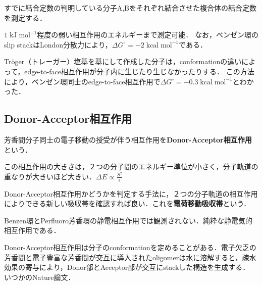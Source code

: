 \documentclass[uplatex, dvipdfmx]{jsreport}
\begin{document}
\begin{method}
    すでに結合定数の判明している分子A,Bをそれぞれ結合させた複合体の結合定数を測定する．

    $1\;\mathrm{kJ\;mol^{-1}}$程度の弱い相互作用のエネルギーまで測定可能．
    なお，ベンゼン環のslip stackはLondon分散力により，$\Delta G^\circ=-2\;\mathrm{kcal\;mol^{-1}}$である．
\end{method}
\begin{method}
    Tröger（トレーガー）塩基を基にして作成した分子は，conformationの違いによって，edge-to-face相互作用が分子内に生じたり生じなかったりする．
    この方法により，ベンゼン環同士のedge-to-face相互作用で$\Delta G^\circ=-0.3\;\mathrm{kcal\;mol^{-1}}$とわかった．
\end{method}

\subsection{Donor-Acceptor相互作用}

\begin{definition}
    芳香間分子同士の電子移動の授受が伴う相互作用を\textbf{Donor-Acceptor相互作用}という．

    この相互作用の大きさは，２つの分子間のエネルギー準位が小さく，分子軌道の重なりが大きいほど大きい．$\Delta E \propto \frac{S^2}{\epsilon}$
\end{definition}
\begin{method}
    Donor-Acceptor相互作用かどうかを判定する手法に，２つの分子軌道の相互作用によりできる新しい吸収帯を確認すれば良い．これを\textbf{電荷移動吸収帯}という．
\end{method}
\begin{remark}
    Benzen環とPerfluoro芳香環の静電相互作用では観測されない．純粋な静電気的相互作用である．
\end{remark}
\begin{example}
    Donor-Acceptor相互作用は分子のconformationを定めることがある．電子欠乏の芳香間と電子豊富な芳香間が交互に導入されたoligomerは水に溶解すると，疎水効果の寄与により，Donor部とAcceptor部が交互にstackした構造を生成する．
    いつかのNature論文．
\end{example}
\end{document}
